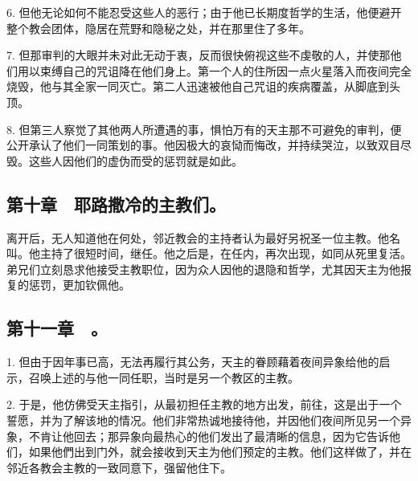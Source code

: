 6. 但他无论如何不能忍受这些人的恶行；由于他已长期度哲学的生活，他便避开整个教会团体，隐居在荒野和隐秘之处，并在那里住了多年。\par

7. 但那审判的大眼并未对此无动于衷，反而很快俯视这些不虔敬的人，并使那他们用以束缚自己的咒诅降在他们身上。第一个人的住所因一点火星落入而夜间完全烧毁，他与其全家一同灭亡。第二人迅速被他自己咒诅的疾病覆盖，从脚底到头顶。\par

8. 但第三人察觉了其他两人所遭遇的事，惧怕万有的天主那不可避免的审判，便公开承认了他们一同策划的事。他因极大的哀恸而悔改，并持续哭泣，以致双目尽毁。这些人因他们的虚伪而受的惩罚就是如此。\par


\subsection{第十章　耶路撒冷的主教们。}

离开后，无人知道他在何处，邻近教会的主持者认为最好另祝圣一位主教。他名叫。他主持了很短时间，继任。他之后是，在任内，再次出现，如同从死里复活。弟兄们立刻恳求他接受主教职位，因为众人因他的退隐和哲学，尤其因天主为他报复的惩罚，更加钦佩他。\par


\subsection{第十一章　。}

1. 但由于因年事已高，无法再履行其公务，天主的眷顾藉着夜间异象给他的启示，召唤上述的与他一同任职，当时是另一个教区的主教。\par

2. 于是，他仿佛受天主指引，从最初担任主教的地方出发，前往，这是出于一个誓愿，并为了解该地的情况。他们非常热诚地接待他，并因他们夜间所见另一个异象，不肯让他回去；那异象向最热心的他们发出了最清晰的信息，因为它告诉他们，如果他們出到门外，就会接收到天主为他们预定的主教。他们这样做了，并在邻近各教会主教的一致同意下，强留他住下。\par

